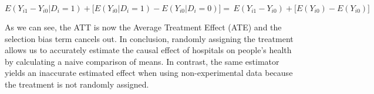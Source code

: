 \documentclass[12pt]{article}
\begin{document}
\begin{equation*}
    E(Y_{i1} - Y_{i0} | D_i = 1)
        + \big[ E(Y_{i0} | D_i = 1) - E(Y_{i0} | D_i = 0) \big]
        = \, E(Y_{i1} - Y_{i0}) + \big[ E(Y_{i0}) - E(Y_{i0}) \big]
\end{equation*}

As we can see, the ATT is now the Average Treatment Effect (ATE) and the
selection bias term cancels out. In conclusion, randomly assigning the
treatment allows us to accurately estimate the causal effect of hospitals on
people's health by calculating a naive comparison of means. In contrast, the
same estimator yields an inaccurate estimated effect when using
non-experimental data because the treatment is not randomly assigned.

\end{document}
